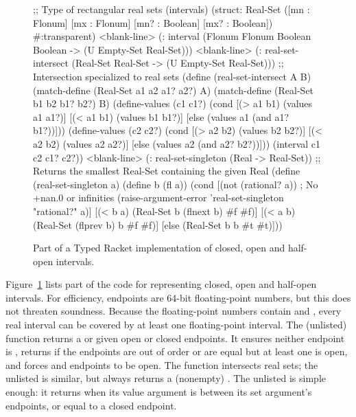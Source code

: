 \begin{figure}[tb!]\centering
\begin{schemedisplay}
;; Type of rectangular real sets (intervals)
(struct: Real-Set ([mn : Flonum] [mx : Flonum] [mn? : Boolean] [mx? : Boolean])
  #:transparent)
<blank-line>
(: interval (Flonum Flonum Boolean Boolean -> (U Empty-Set Real-Set)))
<blank-line>
(: real-set-intersect (Real-Set Real-Set -> (U Empty-Set Real-Set)))
;; Intersection specialized to real sets
(define (real-set-intersect A B)
  (match-define (Real-Set a1 a2 a1? a2?) A)
  (match-define (Real-Set b1 b2 b1? b2?) B)
  (define-values (c1 c1?)
    (cond [(> a1 b1)  (values a1 a1?)]
          [(< a1 b1)  (values b1 b1?)]
          [else       (values a1 (and a1? b1?))]))
  (define-values (c2 c2?)
    (cond [(> a2 b2)  (values b2 b2?)]
          [(< a2 b2)  (values a2 a2?)]
          [else       (values a2 (and a2? b2?))]))
  (interval c1 c2 c1? c2?))
<blank-line>
(: real-set-singleton (Real -> Real-Set))
;; Returns the smallest Real-Set containing the given Real
(define (real-set-singleton a)
  (define b (fl a))
  (cond [(not (rational? a))  ; No +nan.0 or infinities
         (raise-argument-error 'real-set-singleton "rational?" a)]
        [(< b a)  (Real-Set b (flnext b) #f #f)]
        [(< a b)  (Real-Set (flprev b) b #f #f)]
        [else     (Real-Set b b #t #t)]))
\end{schemedisplay}
\bottomhrule
\caption[Typed Racket implementation of intervals]{Part of a Typed Racket implementation of closed, open and half-open intervals.}
\label{fig:typed-racket-real-set}
\end{figure}

Figure~\ref{fig:typed-racket-real-set} lists part of the code for representing closed, open and half-open intervals.
For efficiency, endpoints are 64-bit floating-point numbers, but this does not threaten soundness.
Because the floating-point numbers contain  and , every real interval can be covered by at least one floating-point interval.
The (unlisted)  function returns a  or  given open or closed endpoints.
It ensures neither endpoint is , returns  if the endpoints are out of order or are equal but at least one is open, and forces  and  endpoints to be open.
The  function intersects real sets; the unlisted  is similar, but always returns a (nonempty) .
The unlisted  is simple enough: it returns  when its value argument is between its set argument's endpoints, or equal to a closed endpoint.

